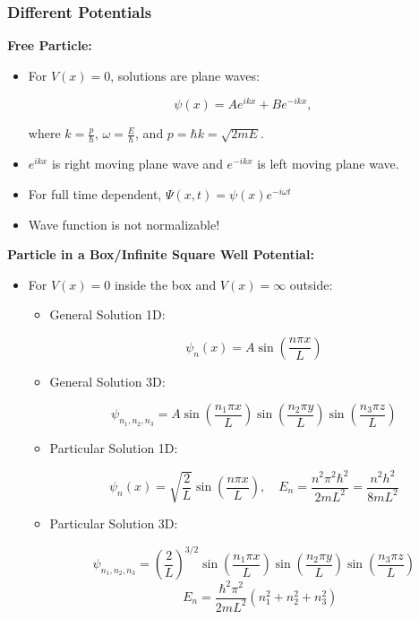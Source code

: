 \documentclass{article}
\newcommand{\eqbox}[1]{\begin{tcolorbox}[colback=gray!10] #1 \end{tcolorbox}}
\newcommand{\conceptbox}[1]{\begin{tcolorbox}[colback=blue!10] #1 \end{tcolorbox}}
\begin{document}
\subsubsection{Different Potentials}
\conceptbox{
\textbf{Free Particle:}
\begin{itemize}
    \item For \( V(x) = 0 \), solutions are plane waves:
    \eqbox{
    \[
    \psi(x) = Ae^{ikx} + Be^{-ikx},
    \]}
    where \( k = \frac{p}{\hbar} \), \( \omega = \frac{E}{\hbar} \), and \(p = \hbar k = \sqrt{2mE}\).
    \item \(e^{ikx}\) is right moving plane wave and \(e^{-ikx}\) is left moving plane wave.
    \item For full time dependent, \(\Psi(x,t) = \psi(x)e^{-i\omega t}\)
    \item Wave function is not normalizable!
\end{itemize}
}

\conceptbox{
\textbf{Particle in a Box/Infinite Square Well Potential:}
\begin{itemize}
    \item For \( V(x) = 0 \) inside the box and \( V(x) = \infty \) outside:
    \begin{itemize}
        \item General Solution 1D:
            \eqbox{
                \[
                    \psi_n(x) = A\sin\left(\frac{n\pi x}{L}\right)
                \]
            }
        \item General Solution 3D:
            \eqbox{
                \[
                \psi_{n_1, n_2, n_3} = A\sin(\frac{n_1 \pi x}{L})\sin(\frac{n_2 \pi y}{L})\sin(\frac{n_3 \pi z}{L})
                \]
            }
        \item Particular Solution 1D:
            \eqbox{
            \[
            \psi_n(x) = \sqrt{\frac{2}{L}} \sin\left(\frac{n\pi x}{L}\right), \quad E_n = \frac{n^2\pi^2\hbar^2}{2mL^2} = \frac{n^2 h^2}{8mL^2}
            \]}
        \item Particular Solution 3D:
            \eqbox{
                \[
                \psi_{n_1, n_2, n_3} = \left(\frac{2}{L}\right)^{3/2}\sin(\frac{n_1 \pi x}{L})\sin(\frac{n_2 \pi y}{L})\sin(\frac{n_3 \pi z}{L})
                \]
                \[
                \quad E_n = \frac{\hbar ^2 \pi^2}{2mL^2}(n_1^2 + n_2^2 + n_3^2)
                \]
            }
    \end{itemize}
\end{itemize}
}
\end{document}

